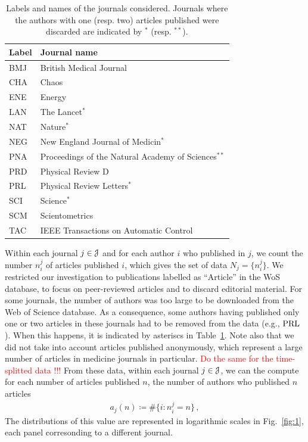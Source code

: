 \documentclass[aps,prl,floatfix,twocolumn]{revtex4-1}
\begin{document}
\begin{table}
 \begin{tabular}{l|l}
  Label & Journal name \\
  \hline
  \hline BMJ & British Medical Journal \\
  \hline CHA & Chaos \\
  \hline ENE & Energy \\
  \hline LAN & The Lancet$^*$ \\
  \hline NAT & Nature$^*$ \\
  \hline NEG & New England Journal of Medicin$^*$ \\
  \hline PNA & Proceedings of the Natural Academy of Sciences$^{**}$ \\
  \hline PRD & Physical Review D \\
  \hline PRL & Physical Review Letters$^*$ \\
  \hline SCI & Science$^*$ \\
  \hline SCM & Scientometrics \\
  \hline TAC & IEEE Transactions on Automatic Control 
 \end{tabular}
 \caption{Labels and names of the journals considered. 
 Journals where the authors with one (resp. two) articles published were discarded are indicated by $^*$ (resp. $^{**}$).}
 \label{tab:journals}
\end{table}

Within each journal $j\in {\cal J}$ and for each author $i$ who published in $j$, we count the number $n^j_i$ of articles published $i$, which gives the set of data $N_j=\{n^j_i\}$. 
We restricted our investigation to publications labelled as ``Article'' in the WoS database, to focus on peer-reviewed articles and to discard editorial material. 
For some journals, the number of authors was too large to be downloaded from the Web of Science database. 
As a consequence, some authors having published only one or two articles in these journals had to be removed from the data (e.g., ${\rm PRL}$). 
When this happens, it is indicated by asteriscs in Table~\ref{tab:journals}.
Note also that we did not take into account articles published anonymously, which represent a large number of articles in medicine journals in particular. 
\textcolor{red}{Do the same for the time-splitted data !!!}
From these data, within each journal $j\in{\cal J}$, we can the compute for each number of articles published $n$, the number of authors who published $n$ articles 
\begin{align}
 a_j(n)\coloneqq\#\{i\colon n^j_i = n\}\, ,
\end{align}
The distributions of this value are represented in logarithmic scales in Fig.~\ref{fig:1}, each panel corresonding to a different journal. 
\end{document}
